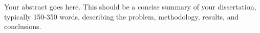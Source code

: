 Your abstract goes here. This should be a concise summary of your dissertation, typically 150-350 words, describing the problem, methodology, results, and conclusions.

\newpage \cleardoublepage     %
\tableofcontents	

\newpage \cleardoublepage     %
\listoftables
{}

\newpage \cleardoublepage     %
\listoffigures
{}